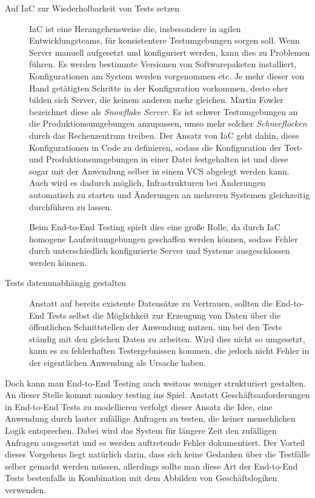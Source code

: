 \documentclass[12pt,a4paper,bibliography=totocnumbered,listof=totocnumbered]{scrartcl}
\begin{document}
\begin{description}
	\item[Auf \ac{IaC} zur Wiederholbarkeit von Tests setzen] \ac{IaC} ist eine Herangehensweise die, insbesondere in agilen Entwicklungsteams, für konsistentere Testumgebungen sorgen soll. Wenn Server manuell aufgesetzt und konfiguriert werden, kann dies zu Problemen führen. Es werden bestimmte Versionen von Softwarepaketen installiert, Konfigurationen am System werden vorgenommen etc. Je mehr dieser von Hand getätigten Schritte in der Konfiguration vorkommen, desto eher bilden sich Server, die keinem anderen mehr gleichen. Martin  Fowler bezeichnet diese als \textit{Snowflake Server}\cite{fowlersnow}. Es ist schwer Testumgebungen an die Produktionsumgebungen anzupassen, umso mehr solcher \textit{Schneeflocken} durch das Rechenzentrum treiben. Der Ansatz von \ac{IaC} geht dahin, diese Konfigurationen in Code zu definieren, sodass die Konfiguration der Test- und Produktionsumgebungen in einer Datei festgehalten ist und diese sogar mit der Anwendung selber in einem \acs{VCS} abgelegt werden kann. Auch wird es dadurch möglich, Infrastrukturen bei Änderungen automatisch zu starten und Änderungen an mehreren Systemen gleichzeitig durchführen zu lassen.\cite{fowlersnow}
	
	Beim End-to-End Testing spielt dies eine große Rolle, da durch \ac{IaC} homogene Laufzeitumgebungen geschaffen werden können, sodass Fehler durch unterschiedlich konfigurierte Server und Systeme ausgeschlossen werden können.\cite{clemson}
	
	\item[Tests datenunabhängig gestalten] Anstatt auf bereits existente Datensätze zu Vertrauen, sollten die End-to-End Tests selbst die Möglichkeit zur Erzeugung von Daten über die öffentlichen Schnittstellen der Anwendung nutzen, um bei den Tests ständig mit den gleichen Daten zu arbeiten. Wird dies nicht so umgesetzt, kann es zu fehlerhaften Testergebnissen kommen, die jedoch nicht Fehler in der eigentlichen Anwendung als Ursache haben.\cite{clemson}
\end{description}

Doch kann man End-to-End Testing auch weitaus weniger strukturiert gestalten. An dieser Stelle kommt monkey testing ins Spiel. Anstatt Geschäftsanforderungen in End-to-End Tests zu modellieren verfolgt dieser Ansatz die Idee, eine Anwendung durch lauter zufällige Anfragen zu testen, die keiner menschlichen Logik entsprechen. Dabei wird das System für längere Zeit den zufälligen Anfragen ausgesetzt und es werden auftretende Fehler dokumentiert. Der Vorteil dieses Vorgehens liegt natürlich darin, dass sich keine Gedanken über die Testfälle selber gemacht werden müssen, allerdings sollte man diese Art der End-to-End Tests bestenfalls in Kombination mit dem Abbilden von Geschäftslogiken verwenden.
\end{document}
